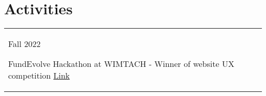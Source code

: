 \documentclass[a4paper,12pt]{article}
\begin{document}
\section{Activities}
\begin{tabularx}{\linewidth}{@{}l X@{}}	
Fall 2022 \
    \begin{minipage}[t]{0.875\linewidth}
    FundEvolve Hackathon at WIMTACH - Winner of website UX competition \hfill\href{https://anth0nywong.github.io/resume/activities/1.0_certificate.pdf}{Link}
    \end{minipage} \\[20pt]
\end{tabularx}


\vfill
\end{document}
